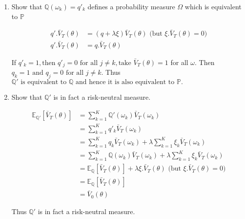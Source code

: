 \documentclass[answers]{exam}
\begin{document}
\begin{parts}
\begin{enumerate}
\begin{solution}
		\end{solution}
		
		\item
		
		Show that $\mathbb{Q(\omega_k)} = q'_k $ defines a probability measure $\Omega$ which is equivalent to $\mathbb{P}$
		
		\begin{solution}
			
			\begin{align*}	
			q'.\bar{V}_T(\theta) &= (q + \lambda\xi)\bar{V}_T(\theta) \text{   (but } \xi. \bar{V}_T(\theta) = 0) \\
			q'.\bar{V}_T(\theta) &= q.\bar{V}_T(\theta)	
			\end{align*}	
			
			If $q'_k = 1, \text{then } q'_j = 0 \text{ for all } j \neq k, \text{take } \bar{V}_T(\theta)=1$ for all $\omega$. Then $q_k = 1 \text{ and } q_j= 0 \text{ for all } j \neq k $. Thus $\mathbb{Q'} \text{ is equivalent to } \mathbb{Q} \text{ and hence it is also equivalent to } \mathbb{P} . $
			
			
		\end{solution}
		
		\item 
		Show that $\mathbb{Q'}$ is in fact a risk-neutral measure.
		
		\begin{solution}
			
			\begin{align*}
			\mathbb{E}_\mathbb{Q'}[\bar{V}_T(\theta)]
			&=\sum_{k=1}^{K}\mathbb{Q'}(\omega_{k}) \bar{V}_T(\omega_k)\\
			&=\sum_{k=1}^{K}q'_k\bar{V}_T(\omega_k)\\
			&=\sum_{k=1}^{K}q_k\bar{V}_T(\omega_k)+ \lambda \sum_{k=1}^{K} \xi_k \bar{V}_T(\omega_k)  \\
			&=\sum_{k=1}^{K}\mathbb{Q}(\omega_{k}) \bar{V}_T(\omega_k) + \lambda \sum_{k=1}^{K} \xi_k \bar{V}_T(\omega_k)\\
			&=\mathbb{E}_\mathbb{Q}[\bar{V}_T(\theta)] + \lambda \xi. \bar{V}_T(\theta)
			\text{   (but } \xi. \bar{V}_T(\theta) = 0)\\
			&=\mathbb{E}_\mathbb{Q}[\bar{V}_T(\theta)]\\
			&=\bar{V}_0(\theta)
			\end{align*}
			
			Thus $\mathbb{Q'}$ is in fact a risk-neutral measure.
			
		\end{solution}
		

\end{enumerate}
\end{parts}
\end{document}
